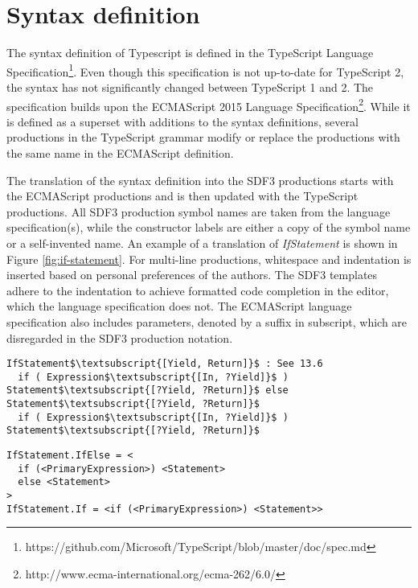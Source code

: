 \section{Syntax definition}
The syntax definition of Typescript is defined in the TypeScript Language Specification\footnote{https://github.com/Microsoft/TypeScript/blob/master/doc/spec.md}.
Even though this specification is not up-to-date for TypeScript 2, the syntax has not significantly changed between TypeScript 1 and 2.
The specification builds upon the ECMAScript 2015 Language Specification\footnote{http://www.ecma-international.org/ecma-262/6.0/}.
While it is defined as a superset with additions to the syntax definitions, several productions in the TypeScript grammar modify or replace the productions with the same name in the ECMAScript definition.

The translation of the syntax definition into the SDF3\citep{Vollebregt:2012:DST:2427048.2427056} productions starts with the ECMAScript productions and is then updated with the TypeScript productions.
All SDF3 production symbol names are taken from the language specification(s), while the constructor labels are either a copy of the symbol name or a self-invented name.
An example of a translation of \textit{IfStatement} is shown in Figure \ref{fig:if-statement}.
For multi-line productions, whitespace and indentation is inserted based on personal preferences of the authors.
The SDF3 templates adhere to the indentation to achieve formatted code completion in the editor, which the language specification does not.
The ECMAScript language specification also includes parameters, denoted by a suffix in subscript, which are disregarded in the SDF3 production notation.

\begin{figure*}
  \begin{lstlisting}[caption=Definition of \textit{IfStatement} in the ECMAScript language specification,mathescape]
IfStatement$\textsubscript{[Yield, Return]}$ : See 13.6
  if ( Expression$\textsubscript{[In, ?Yield]}$ ) Statement$\textsubscript{[?Yield, ?Return]}$ else Statement$\textsubscript{[?Yield, ?Return]}$
  if ( Expression$\textsubscript{[In, ?Yield]}$ ) Statement$\textsubscript{[?Yield, ?Return]}$
  \end{lstlisting}
  \begin{lstlisting}[caption=Definition of \textit{IfStatement} in SDF3 production notation]
IfStatement.IfElse = <
  if (<PrimaryExpression>) <Statement>
  else <Statement>
>
IfStatement.If = <if (<PrimaryExpression>) <Statement>>
  \end{lstlisting}
  \caption{The translation of \textit{IfStatement} from the ECMAScript language specification to SDF3 production notation.}
  \label{fig:if-statement}
\end{figure*}

